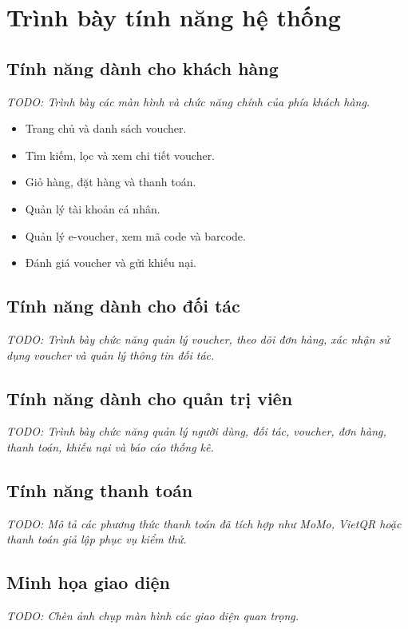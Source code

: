 \section{Trình bày tính năng hệ thống}

\subsection{Tính năng dành cho khách hàng}
\textit{TODO: Trình bày các màn hình và chức năng chính của phía khách hàng.}

\begin{itemize}
    \item Trang chủ và danh sách voucher.
    \item Tìm kiếm, lọc và xem chi tiết voucher.
    \item Giỏ hàng, đặt hàng và thanh toán.
    \item Quản lý tài khoản cá nhân.
    \item Quản lý e-voucher, xem mã code và barcode.
    \item Đánh giá voucher và gửi khiếu nại.
\end{itemize}

\subsection{Tính năng dành cho đối tác}
\textit{TODO: Trình bày chức năng quản lý voucher, theo dõi đơn hàng, xác nhận sử dụng voucher và quản lý thông tin đối tác.}

\subsection{Tính năng dành cho quản trị viên}
\textit{TODO: Trình bày chức năng quản lý người dùng, đối tác, voucher, đơn hàng, thanh toán, khiếu nại và báo cáo thống kê.}

\subsection{Tính năng thanh toán}
\textit{TODO: Mô tả các phương thức thanh toán đã tích hợp như MoMo, VietQR hoặc thanh toán giả lập phục vụ kiểm thử.}

\subsection{Minh họa giao diện}
\textit{TODO: Chèn ảnh chụp màn hình các giao diện quan trọng.}


